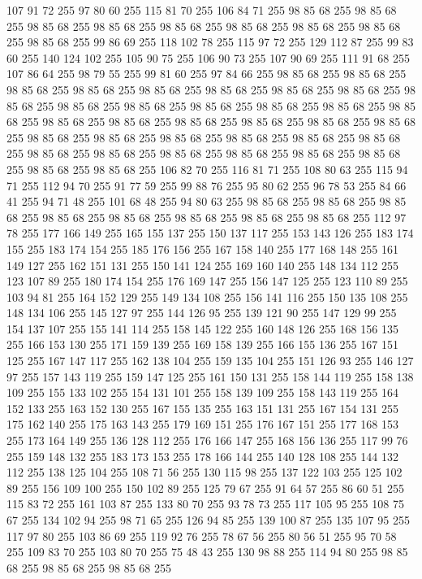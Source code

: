 107 91 72 255 97 80 60 255 115 81 70 255 106 84 71 255 98 85 68 255 98 85 68 255 98 85 68 255 98 85 68 255 98 85 68 255 98 85 68 255 98 85 68 255 98 85 68 255 98 85 68 255 99 86 69 255 118 102 78 255 115 97 72 255 129 112 87 255 99 83 60 255 140 124 102 255 105 90 75 255 106 90 73 255 107 90 69 255 111 91 68 255 107 86 64 255 98 79 55 255 99 81 60 255 97 84 66 255 98 85 68 255 98 85 68 255 98 85 68 255 98 85 68 255 98 85 68 255 98 85 68 255 98 85 68 255 98 85 68 255 98 85 68 255 98 85 68 255 98 85 68 255 98 85 68 255 98 85 68 255 98 85 68 255 98 85 68 255 98 85 68 255 98 85 68 255 98 85 68 255 98 85 68 255 98 85 68 255 98 85 68 255 98 85 68 255 98 85 68 255 98 85 68 255 98 85 68 255 98 85 68 255 98 85 68 255 98 85 68 255 98 85 68 255 98 85 68 255 98 85 68 255 98 85 68 255 98 85 68 255 98 85 68 255 98 85 68 255 106 82 70 255 116 81 71 255
108 80 63 255 115 94 71 255 112 94 70 255 91 77 59 255 99 88 76 255 95 80 62 255 96 78 53 255 84 66 41 255 94 71 48 255 101 68 48 255 94 80 63 255 98 85 68 255 98 85 68 255 98 85 68 255 98 85 68 255 98 85 68 255 98 85 68 255 98 85 68 255 98 85 68 255 112 97 78 255 177 166 149 255 165 155 137 255 150 137 117 255 153 143 126 255 183 174 155 255 183 174 154 255 185 176 156 255 167 158 140 255 177 168 148 255 161 149 127 255 162 151 131 255 150 141 124 255 169 160 140 255 148 134 112 255 123 107 89 255 180 174 154 255 176 169 147 255 156 147 125 255 123 110 89 255 103 94 81 255 164 152 129 255 149 134 108 255 156 141 116 255 150 135 108 255 148 134 106 255 145 127 97 255 144 126 95 255 139 121 90 255 147 129 99 255 154 137 107 255 155 141 114 255 158 145 122 255 160 148 126 255 168 156 135 255 166 153 130 255 171 159 139 255 169 158 139 255 166 155 136 255 167 151 125 255 167 147 117 255 162 138 104 255 159 135 104 255 151 126 93 255 146 127 97 255
157 143 119 255 159 147 125 255 161 150 131 255 158 144 119 255 158 138 109 255 155 133 102 255 154 131 101 255 158 139 109 255 158 143 119 255 164 152 133 255 163 152 130 255 167 155 135 255 163 151 131 255 167 154 131 255 175 162 140 255 175 163 143 255 179 169 151 255 176 167 151 255 177 168 153 255 173 164 149 255 136 128 112 255 176 166 147 255 168 156 136 255 117 99 76 255 159 148 132 255 183 173 153 255 178 166 144 255 140 128 108 255 144 132 112 255 138 125 104 255 108 71 56 255 130 115 98 255 137 122 103 255 125 102 89 255 156 109 100 255 150 102 89 255 125 79 67 255 91 64 57 255 86 60 51 255 115 83 72 255 161 103 87 255 133 80 70 255 93 78 73 255 117 105 95 255 108 75 67 255 134 102 94 255 98 71 65 255 126 94 85 255 139 100 87 255 135 107 95 255 117 97 80 255 103 86 69 255 119 92 76 255 78 67 56 255 80 56 51 255 95 70 58 255 109 83 70 255 103 80 70 255 75 48 43 255 130 98 88 255 114 94 80 255 98 85 68 255 98 85 68 255 98 85 68 255

